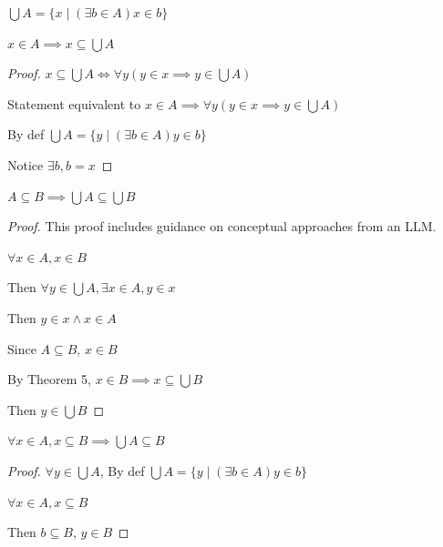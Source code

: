 \documentclass[12pt, a4paper, oneside]{article}
\begin{document}
    \begin{remark}
        $\bigcup A = \{x\mid (\exists b\in A) x\in b\}$
    \end{remark}
      
    \begin{theorem}
        $x\in A \implies x \subseteq \bigcup A$
    \end{theorem}
    
    \begin{proof}
        $x \subseteq \bigcup A \iff \forall y( y \in x \implies y\in \bigcup A)$

        Statement equivalent to $x\in A \implies \forall y( y \in x \implies y\in \bigcup A)$

        By def $\bigcup A = \{y \mid (\exists b \in A) y\in b \}$

        Notice $\exists b, b = x$
    \end{proof}

    \begin{theorem}
        $A \subseteq B \implies \bigcup A \subseteq \bigcup B$
    \end{theorem}
    
    \begin{proof}
        This proof includes guidance on conceptual approaches from an LLM.

        $\forall x \in A, x\in B$

        Then $\forall y \in \bigcup A, \exists x \in A, y \in x$
        
        Then $y\in x \wedge x\in A$

        Since $A \subseteq B$, $x\in B$

        By Theorem 5, $x\in B \implies x \subseteq \bigcup B$

        Then $y \in \bigcup B$
    \end{proof}

    \begin{theorem}
        $\forall x \in A, x \subseteq B \implies \bigcup A \subseteq B$
    \end{theorem}
    
    \begin{proof}
        $\forall  y \in \bigcup A$, By def $\bigcup A = \{y\mid (\exists b \in A)y\in b\}$

        $\forall x\in A, x\subseteq B$
        
        Then $b\subseteq B$, $y\in B$
    \end{proof}
\end{document}
